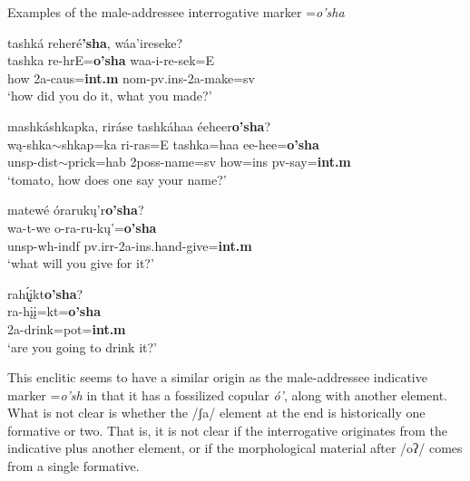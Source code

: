 \newpage
\begin{exe}

\item\label{oPSaexamples} Examples of the male-addressee interrogative marker =\textit{o'sha}

	\begin{xlist}
	
	\item\label{oPSaexamples1}
	\glll tashká reheré\textbf{'sha}, wáa'ireseke?\\
	tashka re-hrE=\textbf{o'sha} waa-i-re-sek=E\\
	\textnormal{how} 2a-caus=\textbf{int.m} nom-pv.ins-2a-\textnormal{make}=sv\\
	\glt `how did you do it, what you made?' \citep[3]{hollow1973a}

	\item\label{oPSaexamples2}
	\glll mashkáshkapka, riráse tashkáhaa éeheer\textbf{o'sha}?\\
	wą-shka$\sim$shkap=ka ri-ras=E tashka=haa ee-hee=\textbf{o'sha}\\
	unsp-dist$\sim$\textnormal{prick}=hab 2poss-\textnormal{name}=sv \textnormal{how}=ins pv-\textnormal{say}=\textbf{int.m}\\
	\glt `tomato, how does one say your name?' \citep[14]{hollow1973a}

	\item\label{oPSaexamples3}
	\glll matewé órarukų'r\textbf{o'sha}?\\
	wa-t-we o-ra-ru-kų'=\textbf{o'sha}\\
	unsp-wh-indf pv.irr-2a-ins.hand-\textnormal{give}=\textbf{int.m}\\
	\glt `what will you give for it?' \citep[29]{hollow1973a}

	\item\label{oPSaexamples4}
	\glll rah\'{ı̨}įkt\textbf{o'sha}?\\
	ra-hįį=kt=\textbf{o'sha}\\
	2a-\textnormal{drink}=pot=\textbf{int.m}\\
	\glt `are you going to drink it?' \citep[454]{hollow1970}
	
	\end{xlist}

\end{exe}

This enclitic seems to have a similar origin as the male-addressee indicative marker =\textit{o'sh} in that it has a fossilized copular \textit{ó'}, along with another element. What is not clear is whether the /ʃa/ element at the end is historically one formative or two. That is, it is not clear if the interrogative originates from the indicative plus another element, or if the morphological material after /oʔ/ comes from a single formative. 

